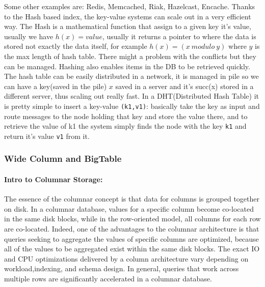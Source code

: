 \documentclass[a4page, 11pt]{article}
\begin{document}
Some other examples are: Redis, Memcached, Riak, Hazelcast, Encache.
\newline
Thanks to the Hash based index, the key-value systems can scale out in a very efficient way. 
The Hash is a mathematical function that assign to a given key it's value, usually we have $h(x) = value$, usually it returns a pointer to where the data is stored not exactly the data itself, for example $h(x) = (x\ modulo\ y)$ where $y$ is the max length of hash table. 
There might a problem with the conflicts but they can be managed. 
Hashing also enables items in the DB to be retrieved quickly. 
The hash table can be easily distributed in a network, it is managed in pile so we can have a key(saved in the pile) $x$ saved in a server and it's succ(x) stored in a different server, thus scaling out really fast. 
\newline
In a DHT(Distributed Hash Table) it is pretty simple to insert a key-value \texttt{(k1,v1)}: basically take the key as input and route messages to the node holding that key and store the value there, and to retrieve the value of k1 the system simply finds the node with the key \texttt{k1} and return it's value \texttt{v1} from it.

\subsubsection{Wide Column and BigTable}
\paragraph{Intro to Columnar Storage:}%
The essence of the columnar concept is that data for columns is grouped together on disk. In a columnar database, values for a specific column become co-located in the same disk blocks, while in the row-oriented model, all columns for each row are co-located. Indeed, one of the advantages to the columnar architecture is that queries seeking to aggregate the values of specific columns are optimized, because all of the values to be aggregated exist within the same disk blocks. The exact IO and CPU optimizations delivered by a column architecture vary depending on workload,indexing, and schema design. In general, queries that work across multiple rows are significantly accelerated in a columnar database.\\
\end{document}
